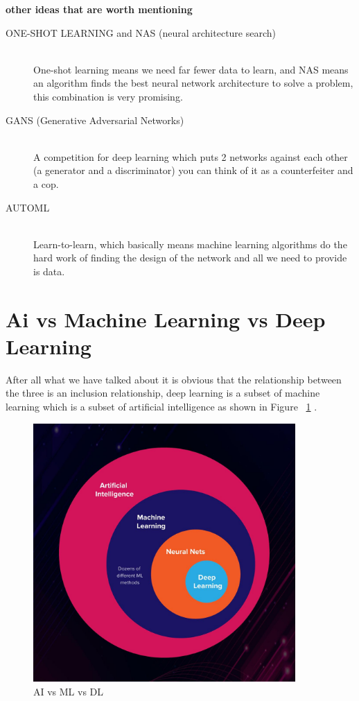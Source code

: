             \bigskip \textbf{other ideas that are worth mentioning} ~\cite{dl}
                \begin{description}
                \item [ONE-SHOT LEARNING and NAS (neural architecture search)] \hfill \\
                    One-shot learning means we need far fewer data to learn, and NAS means an algorithm finds the best neural network architecture to solve a problem, this combination is very promising.
                \item [GANS (Generative Adversarial Networks)] \hfill \\
                    A competition for deep learning which puts 2 networks against each other (a generator and a discriminator) you can think of it as a counterfeiter and a cop.
                \item [AUTOML] \hfill \\
                    Learn-to-learn, which basically means machine learning algorithms do the hard work of finding the design of the network and all we need to provide is data.
                \end{description}
    
    
    \section{Ai vs Machine Learning vs Deep Learning}
        After all what we have talked about it is obvious that the relationship between the three is an inclusion relationship, deep learning is a subset of machine learning which is a subset of artificial intelligence as shown in Figure ~\ref{fig:versus} .
    
    \begin{figure}[htbp]
    \begin{center}
    \includegraphics[width=10cm]{./chapter-02-general-ai-information/versus.jpg}
    \end{center}
    \caption{AI vs ML vs DL ~\cite{versus}}
    \label{fig:versus}
    \end{figure}
    

